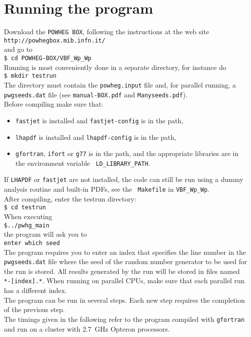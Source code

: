 \documentclass[a4paper,11pt]{article}
\begin{document}
\section*{Running the program}
%
Download the {\tt POWHEG BOX}, following the instructions at the web site 
\\[2ex]
{\tt http://powhegbox.mib.infn.it/}
\\[2ex] 
and go to 
\\[2ex]
{\tt \$ cd POWHEG-BOX/VBF\_Wp\_Wp}
\\[2ex]
Running is most conveniently done in a separate directory, for instance do
\\[2ex]
{\tt \$ mkdir testrun}
\\[2ex]
The directory must contain the {\tt powheg.input} file and, for
parallel running, a {\tt pwgseeds.dat} file (see {\tt manual-BOX.pdf}
and {\tt Manyseeds.pdf}).
\\[2ex]
Before compiling make sure that:
\begin{itemize}
\item 
{\tt fastjet} is installed and {\tt fastjet-config} is in the path,
\item 
{\tt lhapdf} is installed and {\tt lhapdf-config} is in the path,
\item
{\tt gfortran}, {\tt ifort} or {\tt g77} is in the path, and the
appropriate libraries are in the environment variable {\tt
  LD\_LIBRARY\_PATH}. 
\end{itemize}
%
If {\tt LHAPDF} or {\tt fastjet} are not installed, the code can still
be run using a dummy analysis routine and built-in PDFs, see the {\tt
  Makefile} in {\tt VBF\_Wp\_Wp}.
%
\\[2ex]
After compiling, enter the testrun directory:
\\[2ex]
{\tt \$ cd testrun}
\\[2ex]
When executing
\\[2ex]
{\tt \$../pwhg\_main}
\\[2ex]
the program will ask you to
\\[2ex]
{\tt enter which seed}
\\[2ex]
The program requires you to enter an index that specifies the line
number in the {\tt pwgseeds.dat} file where the seed of the random
number generator to be used for the run is stored. All results
generated by the run will be stored in files named {\tt
  *-[index].*}. When running on parallel CPUs, make sure that each
parallel run has a different index.
\\[2ex]
The program can be run in several steps. Each new step requires the
completion of the previous step.
\\[2ex]
The timings given in the following refer to the program compiled with
{\tt gfortran} and run on a cluster with 2.7~GHz Opteron processors.
% 
\end{document}
